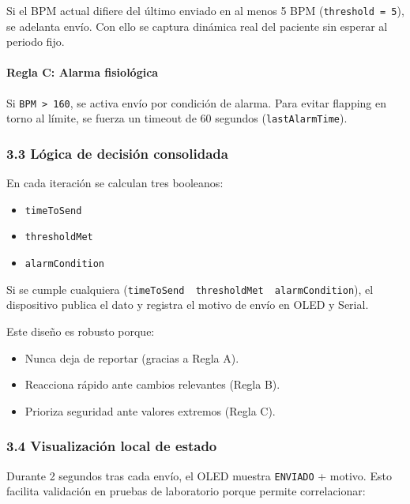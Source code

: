 \documentclass[11pt]{article}
\providecommand{\tightlist}{%
      \setlength{\itemsep}{0pt}\setlength{\parskip}{0pt}}
\begin{document}
Si el BPM actual difiere del último enviado en al menos 5 BPM
(\texttt{threshold\ =\ 5}), se adelanta envío. Con ello se captura
dinámica real del paciente sin esperar al periodo fijo.

\paragraph{Regla C: Alarma
fisiológica}\label{regla-c-alarma-fisioluxf3gica}

Si \texttt{BPM\ \textgreater{}\ 160}, se activa envío por condición de
alarma. Para evitar flapping en torno al límite, se fuerza un timeout de
60 segundos (\texttt{lastAlarmTime}).

\subsubsection{3.3 Lógica de decisión
consolidada}\label{luxf3gica-de-decisiuxf3n-consolidada}

En cada iteración se calculan tres booleanos:

\begin{itemize}
\tightlist
\item
  \texttt{timeToSend}
\item
  \texttt{thresholdMet}
\item
  \texttt{alarmCondition}
\end{itemize}

Si se cumple cualquiera
(\texttt{timeToSend\ \textbar{}\textbar{}\ thresholdMet\ \textbar{}\textbar{}\ alarmCondition}),
el dispositivo publica el dato y registra el motivo de envío en OLED y
Serial.

Este diseño es robusto porque:

\begin{itemize}
\tightlist
\item
  Nunca deja de reportar (gracias a Regla A).
\item
  Reacciona rápido ante cambios relevantes (Regla B).
\item
  Prioriza seguridad ante valores extremos (Regla C).
\end{itemize}

\subsubsection{3.4 Visualización local de
estado}\label{visualizaciuxf3n-local-de-estado}

Durante 2 segundos tras cada envío, el OLED muestra \texttt{ENVIADO} +
motivo. Esto facilita validación en pruebas de laboratorio porque
permite correlacionar:
\end{document}

